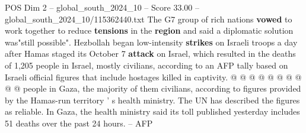 \begin{textsample}{POS Dim 2 – global\_south\_2024\_10 – Score 33.00 – global\_south\_2024\_10/115362440.txt}
The G7 group of rich nations \textbf{vowed} to work together to reduce \textbf{tensions} in the \textbf{region} and said a diplomatic solution was"still possible".
Hezbollah began low-intensity \textbf{strikes} on Israeli troops a day after Hamas staged its October 7 \textbf{attack} on Israel, which resulted in the deaths of 1,205 people in Israel, mostly civilians, according to an AFP tally based on Israeli official figures that include hostages killed in captivity. @ @ @ @ @ @ @ @ @ @ people in Gaza, the majority of them civilians, according to figures provided by the Hamas-run territory ' s health ministry.
The UN has described the figures as reliable.
In Gaza, the health ministry said its toll published yesterday includes 51 deaths over the past 24 hours. -- AFP

\end{textsample}

